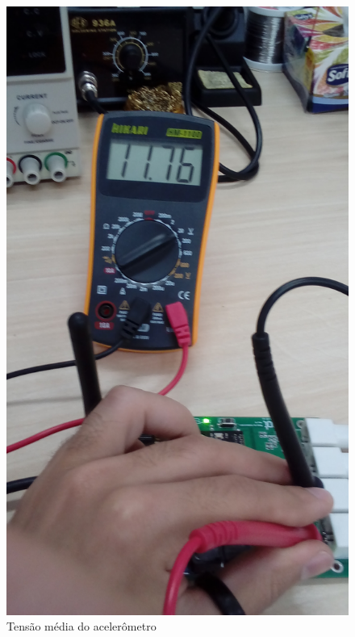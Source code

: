 \documentclass[11pt]{abntex2}
\begin{document}
					\begin{figure}[!ht]
						\centering
						\begin{minipage}{0.4\linewidth}
							\centering
							\includegraphics[angle=-90,width = \linewidth]{../Fotos/tensaoAcc.jpg}
							\caption{Tensão média do acelerômetro}
						\end{minipage}
						\hfill\vline\hfill
						\begin{minipage}{0.4\linewidth}
							\centering

\end{minipage}
\end{figure}
\end{document}
